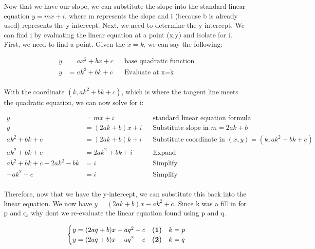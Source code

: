 \documentclass[12pt]{book}
\begin{document}
\begin{enumerate}
\vspace{-1cm}
Now that we have our slope, we can substitute the slope into the standard 
linear equation $y=mx+i$. where m represents the slope and i (because b is 
already used) represents the y-intercept. Next, we need to determine the 
y-intercept. We can find i by evaluating the linear equation at a point (x,y) 
and isolate for i. First, we need to find a point. Given the $x=k$, we can say the following:

\vspace{-0.3cm}
\addtolength{\jot}{0.4em}
\begin{align*}
    y &= ax^2+bx+c && \text{base quadratic function} \\
    y &= ak^2+bk+c && \text{Evaluate at x=k} \\
\end{align*}

\vspace{-1cm}
With the coordinate $(k,ak^2+bk+c)$, which is where the tangent line 
meets the quadratic equation, we can now solve for i:

\vspace{-0.3cm}
\addtolength{\jot}{0.3em}
\begin{align*}
    y &= mx + i && \text{standard linear equation formula} \\
    y &= (2ak+b)x + i && \text{Substitute slope in } m = 2ak+b \\
    ak^2+bk+c &= (2ak+b)k + i && \text{Substitute coordinate in } (x,y) = (k,ak^2+bk+c) \\
    ak^2+bk+c &= 2ak^2+bk + i && \text{Expand} \\
    ak^2+bk+c - 2ak^2 - bk &= i && \text{Simplify} \\
    -ak^2+c &= i && \text{Simplify} \\
\end{align*}

\newpage

Therefore, now that we have the y-intercept, we can substitute 
this back into the linear equation. We now have $y = (2ak+b)x - ak^2+c$. 
Since k was a fill in for p and q, why dont we re-evaluate the linear equation 
found using p and q. 

\[ \begin{cases} 
    y = (2aq+b)x - aq^2+c & \textbf{(1)} \text{\space \space \space} k=p \\
    y = (2aq+b)x - aq^2+c & \textbf{(2)} \text{\space \space \space} k=q
 \end{cases}
\]


\end{enumerate}
\end{document}

